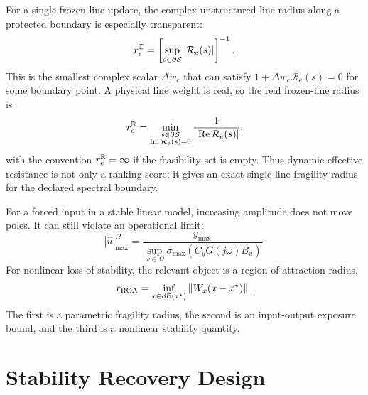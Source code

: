 For a single frozen line update, the complex unstructured line radius along a
protected boundary is especially transparent:
\begin{equation}
  r_{e}^{\mathbb{C}}
  =
  \left[
  \sup_{s\in\partial\mathcal S}
  |\mathcal R_e(s)|
  \right]^{-1}.
  \label{eq:graph_complex_line_radius}
\end{equation}
This is the smallest complex scalar \(\Delta w_e\) that can satisfy
\(1+\Delta w_e\mathcal R_e(s)=0\) for some boundary point. A physical line
weight is real, so the real frozen-line radius is
\begin{equation}
  r_{e}^{\mathbb{R}}
  =
  \min_{\substack{s\in\partial\mathcal S\\
  \operatorname{Im}\mathcal R_e(s)=0}}
  \frac{1}{|\operatorname{Re}\mathcal R_e(s)|},
  \label{eq:graph_real_line_radius}
\end{equation}
with the convention \(r_e^{\mathbb{R}}=\infty\) if the feasibility set is empty. Thus
dynamic effective resistance is not only a ranking score; it gives an exact
single-line fragility radius for the declared spectral boundary.

For a forced input in a stable linear model, increasing amplitude does not move
poles. It can still violate an operational limit:
\begin{equation}
  |\widehat u|_{\max}^{\Omega}
  =
  \frac{y_{\max}}
  {\sup_{\omega\in\Omega}
  \sigma_{\max}\!\left(C_yG(j\omega)B_u\right)}.
  \label{eq:graph_forced_amplitude_radius}
\end{equation}
For nonlinear loss of stability, the relevant object is a region-of-attraction
radius,
\begin{equation}
  r_{\rm ROA}
  =
  \inf_{x\in\partial\mathcal B(x^\star)}
  \left\lVert W_x(x-x^\star) \right\rVert.
  \label{eq:graph_roa_radius}
\end{equation}
The first is a parametric fragility radius, the second is an input-output
exposure bound, and the third is a nonlinear stability quantity.

\section{Stability Recovery Design}

